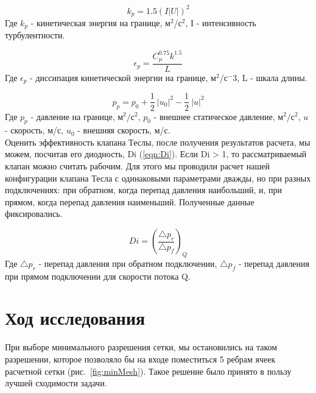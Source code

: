 \documentclass[10pt,a4paper]{book}
\begin{document}
    \begin{equation}\label{eqn:kI}
        k_{p} = 1.5 (I |U|)^2
    \end{equation}
    Где $k_{p}$ - кинетическая энергия на границе, м$^2$/с$^2$, I - интенсивность турбулентности.
    
    \begin{equation}\label{eqn:el}
        \epsilon_{p} = \frac{C_{\mu}^{0.75} k^{1.5}}{L}           
    \end{equation}
    Где $\epsilon_{p}$ - диссипация кинетической энергии на границе, м$^2$/с$^-3$, L - шкала длины.
    
    \begin{equation}\label{eqn:P0}
        p_{p} = p_{0} + \frac{1}{2}\ \left|u_{0}\right|^2 - \frac{1}{2}\ \left|u\right|^2
    \end{equation}
    Где $p_{p}$ - давление на границе, м$^{2}/$с$^{2}$, $p_{0}$ - внешнее статическое давление, м$^{2}/$с$^{2}$, $u$ - скорость, м/с, $u_{0}$ - внешняя скорость, м/с.\\
    
    Оценить эффективность клапана Теслы, после получения результатов расчета, мы можем, посчитав его диодность, Di (\ref{eqn:Di}). Если Di > 1, то рассматриваемый клапан можно считать рабочим. Для этого мы проводили расчет нашей конфигурации клапана Тесла с одинаковыми параметрами дважды, но при разных подключениях: при обратном, когда перепад давления наибольший, и, при прямом, когда перепад давления наименьший. Полученные данные фиксировались.         
    
    \begin{equation}\label{eqn:Di}
        Di = (\frac{\bigtriangleup p_{r}}{\bigtriangleup p_{f}})_Q
    \end{equation}
    Где $\bigtriangleup p_{r}$ - перепад давления при обратном подключении, $\bigtriangleup p_{f}$ - перепад давления при прямом подключении для скорости потока Q.
    
    \section{Ход исследования}
    
    При выборе минимального разрешения сетки, мы остановились на таком разрешении, которое позволяло бы на входе поместиться 5 ребрам ячеек расчетной сетки (рис.~\ref{fig:minMesh}). Такое решение было принято в пользу лучшей сходимости задачи.
    
\end{document}
